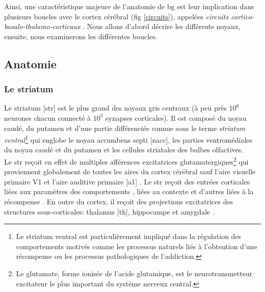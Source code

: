 Ainsi, une caractéristique majeure de l'anatomie de \gls{bg} est leur implication dans plusieurs boucles avec le cortex cérébral (fig \ref{circuits}), appelées \textit{circuits cortico-basalo-thalamo-corticaux} \cite{Alexander:1986, Alexander:1990, Strick:1995}. Nous allons d'abord décrire les différents noyaux, ensuite, nous examinerons les différentes boucles.\\

\subsection {Anatomie}

\subsubsection{Le striatum}

Le striatum [\gls{str}] est le plus grand des noyaux gris centraux (à peu près $10^6$ neurones chacun connecté à $10^3$ synapses corticales). Il est composé du noyau caudé, du putamen et d'une partie différenciée connue sous le terme \textit{striatum ventral}\footnote{Le striatum ventral est particulièrement impliqué dans la régulation des comportements motivés comme les processus naturels liés à l'obtention d'une récompense ou les processus pathologiques de l'addiction. %
} qui englobe le noyau accumbens septi [\gls{nacc}], les parties ventromédiales du noyau caudé et du putamen et les cellules striatales des bulbes olfactives.\\

Le \gls{str} reçoit en effet de multiples afférences excitatrices glutamatergiques\footnote{Le glutamate, forme ionisée de l'acide glutamique, est le neurotransmetteur excitateur le plus important du système nerveux central.} qui proviennent globalement de toutes les aires du cortex cérébral sauf l'aire visuelle primaire V1 et l'aire auditive primaire [\gls{a1}] \cite{Albin:1995, Gerfen:1990, Kemp:1970, Cherubini:1988}. Le \gls{str} reçoit des entrées corticales liées aux paramètres des comportements \cite{Bauswein:1989,Turner:2000,Crutcher:1990}, liées au contexte \cite{Kimura:1990,Kimura:1992} et d'autres liées à la récompense \cite{Kawagoe:1998}. En outre du cortex, il reçoit des projections excitatrices des structures sous-corticales: thalamus [\gls{th}], hippocampe et amygdale \cite{Lapper:1992, Sadikot:1992}.\\ 

